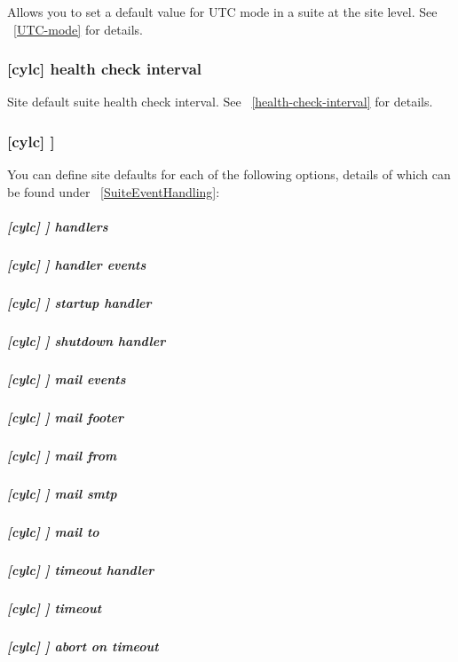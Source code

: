 Allows you to set a default value for UTC mode in a suite at the site level.
See ~\ref{UTC-mode} for details.

\subsubsection[health check interval]{[cylc] \textrightarrow health check interval}

Site default suite health check interval.
See ~\ref{health-check-interval} for details.

\subsubsection[{[}events{]}]{[cylc] \textrightarrow [[events]]}
\label{SiteCylcHooks}

You can define site defaults for each of the following options, details
of which can be found under ~\ref{SuiteEventHandling}:

\subparagraph[handlers]{[cylc] \textrightarrow [[events]] \textrightarrow handlers}

\subparagraph[handler events]{[cylc] \textrightarrow [[events]] \textrightarrow handler events}

\subparagraph[startup handler]{[cylc] \textrightarrow [[events]] \textrightarrow startup handler}

\subparagraph[shutdown handler]{[cylc] \textrightarrow [[events]] \textrightarrow shutdown handler}

\subparagraph[mail events]{[cylc] \textrightarrow [[events]] \textrightarrow mail events}

\subparagraph[mail footer]{[cylc] \textrightarrow [[events]] \textrightarrow mail footer}

\subparagraph[mail from]{[cylc] \textrightarrow [[events]] \textrightarrow mail from}

\subparagraph[mail smtp]{[cylc] \textrightarrow [[events]] \textrightarrow mail smtp}

\subparagraph[mail to]{[cylc] \textrightarrow [[events]] \textrightarrow mail to}

\subparagraph[timeout handler]{[cylc] \textrightarrow [[events]] \textrightarrow timeout handler}

\subparagraph[timeout]{[cylc] \textrightarrow [[events]] \textrightarrow timeout}

\subparagraph[abort on timeout]{[cylc] \textrightarrow [[events]] \textrightarrow abort on timeout}

